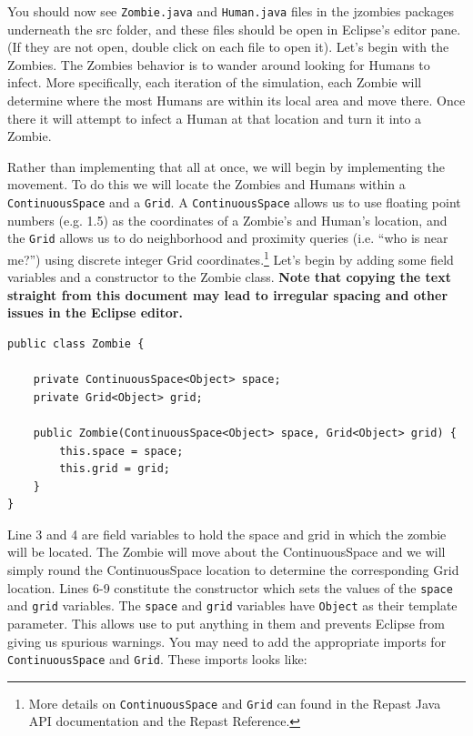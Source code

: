 \documentclass[11pt]{amsart}
\begin{document}
You should now see  \texttt{Zombie.java}  and \texttt{Human.java} files in the jzombies packages underneath the src folder, and these files should be open in Eclipse's editor pane. (If they are not open, double click on each file to open it). Let's begin with the Zombies. The Zombies behavior is to wander around looking for Humans to infect. More specifically, each iteration of the simulation, each Zombie will determine where the most Humans are within its local area and move there. Once there it will attempt to infect a Human at that location and turn it into a Zombie. 

Rather than implementing that all at once, we will begin by implementing the movement. To do this we will locate the Zombies and Humans within a \texttt{ContinuousSpace} and a \texttt{Grid}. A \texttt{ContinuousSpace} allows us to use floating point numbers (e.g. 1.5) as the coordinates of a Zombie's and Human's location, and the \texttt{Grid} allows us to do neighborhood and proximity queries (i.e. ``who is near me?'') using discrete integer Grid coordinates.\footnote{More details on \texttt{ContinuousSpace} and \texttt{Grid} can found in the Repast Java API documentation and the Repast Reference.} Let's begin by adding some field variables and a constructor to the Zombie class. \textbf{Note that copying the text straight from this document may lead to irregular spacing and other issues in the Eclipse editor.}

\noindent\begin{minipage}[h]{\textwidth}
\vspace{.2in}
\lstset{language=java,caption=Zombie Constructor and Variables}
\begin{lstlisting}
public class Zombie {

	private ContinuousSpace<Object> space;
	private Grid<Object> grid;
	
	public Zombie(ContinuousSpace<Object> space, Grid<Object> grid) {
		this.space = space;
		this.grid = grid;
	}
}
\end{lstlisting}
\vspace{.2in}
\end{minipage}

Line 3 and 4 are field variables to hold the space and grid in which the zombie will be located. The Zombie will move about the ContinuousSpace and we will simply round the ContinuousSpace location to determine the corresponding Grid location. Lines 6-9 constitute the constructor which sets the values of the \texttt{space} and \texttt{grid} variables. The \texttt{space} and \texttt{grid} variables have \texttt{Object} as their template parameter. This allows use to put anything in them and prevents Eclipse from giving us spurious warnings. You may need to add the appropriate imports for \texttt{ContinuousSpace} and \texttt{Grid}. These imports looks like:
\end{document}
